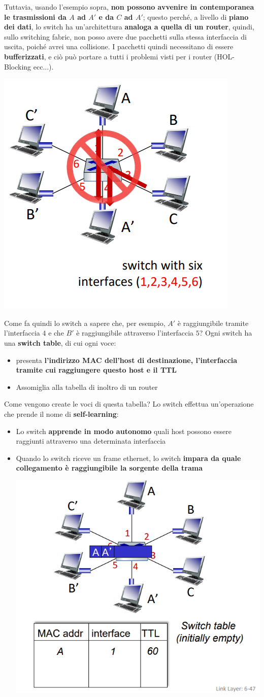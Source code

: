\documentclass[12pt]{article}
\begin{document}
Tuttavia, usando l'esempio sopra, \textbf{non possono avvenire in contemporanea le trasmissioni da $A$ ad $A'$ e da $C$ ad $A'$}; questo perché, a livello di \textbf{piano dei dati}, lo switch
ha un'architettura \textbf{analoga a quella di un router}, quindi, sullo switching fabric, non posso avere due pacchetti sulla stessa interfaccia di uscita, poiché avrei una collisione.
I pacchetti quindi necessitano di essere \textbf{bufferizzati}, e ciò può portare a tutti i problemi visti per i router (HOL-Blocking ecc...).
\begin{center}
    \includegraphics[width =0.40\linewidth]{Images/139.png}
\end{center}
Come fa quindi lo switch a sapere che, per esempio, $A'$ è raggiungibile tramite l'interfaccia $4$ e che $B'$ è raggiungibile attraverso l'interfaccia $5$?
Ogni switch ha una \textbf{switch table}, di cui ogni voce:
\begin{itemize}
    \item presenta \textbf{l'indirizzo MAC dell'host di destinazione, l'interfaccia tramite cui raggiungere questo host e il TTL}
    \item Assomiglia alla tabella di inoltro di un router
\end{itemize}
Come vengono create le voci di questa tabella? Lo switch effettua un'operazione che prende il nome di \textbf{self-learning}:
\begin{itemize}
    \item Lo switch \textbf{apprende in modo autonomo} quali host possono essere raggiunti attraverso una determinata interfaccia
    \item Quando lo switch riceve un frame ethernet, lo switch \textbf{impara da quale collegamento è raggiungibile la sorgente della trama}
    \begin{center}
        \includegraphics[width =0.50\linewidth]{Images/140.png}
    \end{center}
\end{itemize}
\end{document}
